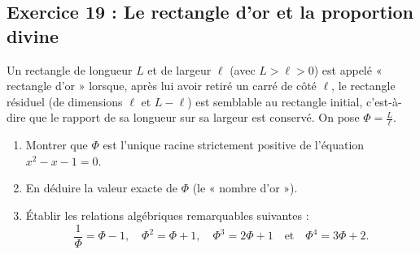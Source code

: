 \documentclass[11pt,a4paper]{article}
\begin{document}
\subsection*{Exercice 19 : Le rectangle d'or et la proportion divine}
Un rectangle de longueur $L$ et de largeur $\ell$ (avec $L > \ell > 0$) est appelé « rectangle d'or » lorsque, après lui avoir retiré un carré de côté $\ell$, le rectangle résiduel (de dimensions $\ell$ et $L - \ell$) est semblable au rectangle initial, c'est-à-dire que le rapport de sa longueur sur sa largeur est conservé.
On pose $\Phi = \frac{L}{\ell}$.
\begin{enumerate}
    \item Montrer que $\Phi$ est l'unique racine strictement positive de l'équation $x^2 - x - 1 = 0$.
    \item En déduire la valeur exacte de $\Phi$ (le « nombre d'or »).
    \item Établir les relations algébriques remarquables suivantes :
    \[
    \frac{1}{\Phi} = \Phi - 1, \quad \Phi^2 = \Phi + 1, \quad \Phi^3 = 2\Phi + 1 \quad \text{et} \quad \Phi^4 = 3\Phi + 2.
    \]
\end{enumerate}
\end{document}
